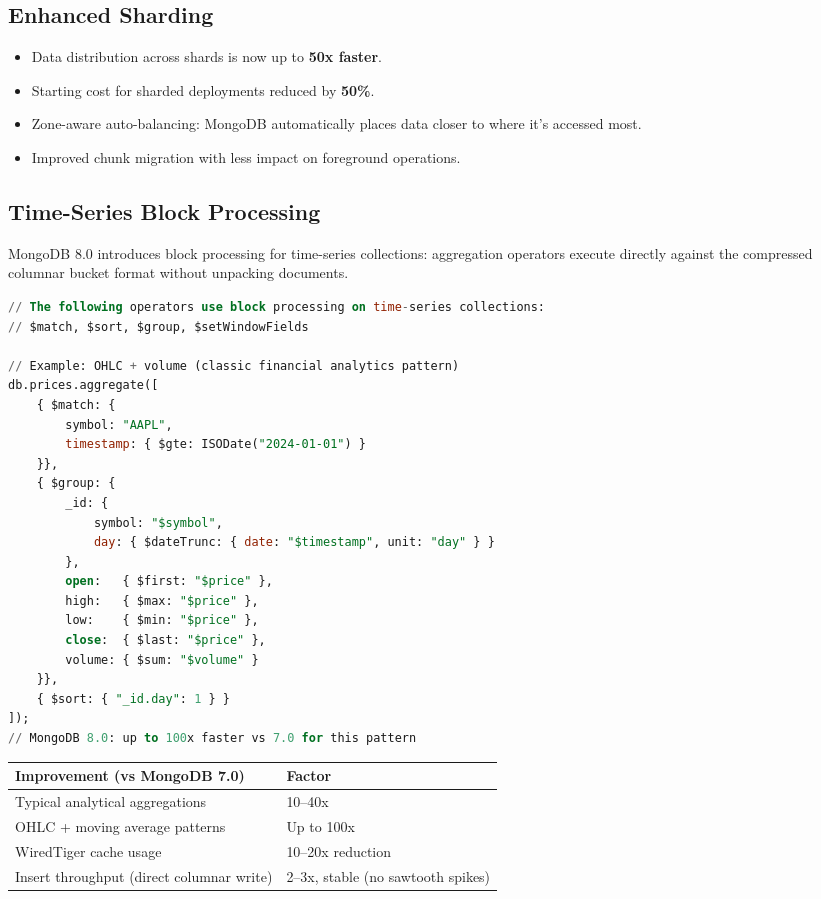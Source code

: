 \documentclass[12pt,a4paper]{article}
\begin{document}
\subsection{Enhanced Sharding}

\begin{itemize}
    \item Data distribution across shards is now up to \textbf{50x faster}.
    \item Starting cost for sharded deployments reduced by \textbf{50\%}.
    \item Zone-aware auto-balancing: MongoDB automatically places data closer to where it's accessed most.
    \item Improved chunk migration with less impact on foreground operations.
\end{itemize}

\subsection{Time-Series Block Processing}

MongoDB 8.0 introduces block processing for time-series collections: aggregation operators execute directly against the compressed columnar bucket format without unpacking documents.

\begin{lstlisting}[language=SQL, caption={Time-series aggregation benefiting from block processing}]
// The following operators use block processing on time-series collections:
// $match, $sort, $group, $setWindowFields

// Example: OHLC + volume (classic financial analytics pattern)
db.prices.aggregate([
    { $match: {
        symbol: "AAPL",
        timestamp: { $gte: ISODate("2024-01-01") }
    }},
    { $group: {
        _id: {
            symbol: "$symbol",
            day: { $dateTrunc: { date: "$timestamp", unit: "day" } }
        },
        open:   { $first: "$price" },
        high:   { $max: "$price" },
        low:    { $min: "$price" },
        close:  { $last: "$price" },
        volume: { $sum: "$volume" }
    }},
    { $sort: { "_id.day": 1 } }
]);
// MongoDB 8.0: up to 100x faster vs 7.0 for this pattern
\end{lstlisting}

\begin{center}
\begin{tabular}{ll}
\toprule
\textbf{Improvement (vs MongoDB 7.0)} & \textbf{Factor} \\
\midrule
Typical analytical aggregations & 10--40x \\
OHLC + moving average patterns & Up to 100x \\
WiredTiger cache usage & 10--20x reduction \\
Insert throughput (direct columnar write) & 2--3x, stable (no sawtooth spikes) \\
\bottomrule
\end{tabular}
\end{center}
\end{document}
